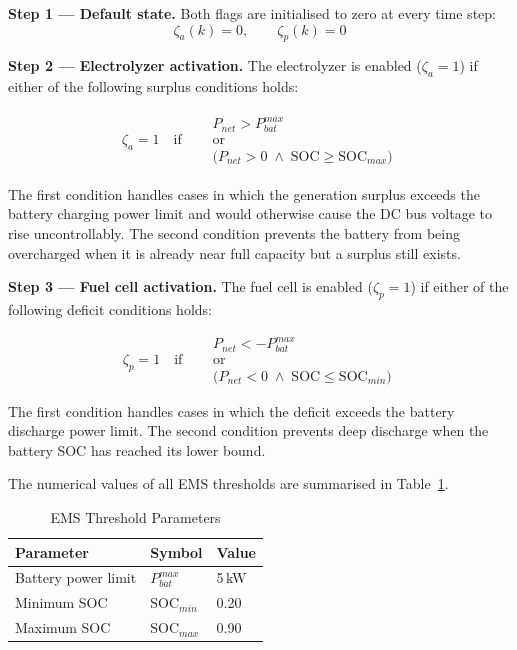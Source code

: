 \documentclass[journal]{IEEEtran}
\begin{document}
\textbf{Step 1 — Default state.} Both flags are initialised to zero at
every time step:
\begin{equation}
\zeta_a(k) = 0, \qquad \zeta_p(k) = 0
\label{eq:ems_default}
\end{equation}

\textbf{Step 2 — Electrolyzer activation.} The electrolyzer is enabled
($\zeta_a = 1$) if either of the following surplus conditions holds:

\begin{equation}
\begin{split}
\zeta_a = 1 \quad \text{if} \quad
\begin{aligned}
& P_{net} > P_{bat}^{max} \\
& \text{or} \\
& \bigl(P_{net} > 0 \;\wedge\; \mathrm{SOC} \geq \mathrm{SOC}_{max}\bigr)
\end{aligned}
\label{eq:ems_ae}
\end{split}
\end{equation}

The first condition handles cases in which the generation surplus exceeds
the battery charging power limit and would otherwise cause the DC bus
voltage to rise uncontrollably. The second condition prevents the battery
from being overcharged when it is already near full capacity but a surplus
still exists.

\textbf{Step 3 — Fuel cell activation.} The fuel cell is enabled
($\zeta_p = 1$) if either of the following deficit conditions holds:

\begin{equation}
\zeta_p = 1 \quad \text{if} \quad
\begin{aligned}
& P_{net} < -P_{bat}^{max} \\
& \text{or} \\
& \bigl(P_{net} < 0 \;\wedge\; \mathrm{SOC} \leq \mathrm{SOC}_{min}\bigr)
\end{aligned}
\label{eq:ems_fc}
\end{equation}

The first condition handles cases in which the deficit exceeds the battery
discharge power limit. The second condition prevents deep discharge when the
battery SOC has reached its lower bound.

The numerical values of all EMS thresholds are summarised in
Table~\ref{tab:ems_params}.

\begin{table}[!h]
\caption{EMS Threshold Parameters}
\label{tab:ems_params}
\centering
\begin{tabular}{@{}lll@{}}
\toprule
Parameter & Symbol & Value \\
\midrule
Battery power limit    & $P_{bat}^{max}$    & 5\,kW \\
Minimum SOC            & $\mathrm{SOC}_{min}$ & 0.20  \\
Maximum SOC            & $\mathrm{SOC}_{max}$ & 0.90  \\
\bottomrule
\end{tabular}
\end{table}
\end{document}
